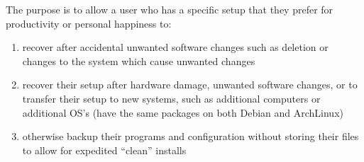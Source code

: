 \documentclass[10pt]{article}
\begin{document}
            The purpose is to allow a user who has a specific setup that they prefer for productivity or personal happiness to:
            \begin{enumerate}
                \item recover after accidental unwanted software changes such as deletion or changes to the system which cause unwanted changes
                \item recover their setup after hardware damage, unwanted software changes, or to transfer their setup to new systems, such as additional computers or additional OS's (have the same packages on both Debian and ArchLinux)
                \item otherwise backup their programs and configuration without storing their files to allow for expedited ``clean'' installs
            \end{enumerate}


\end{document}
